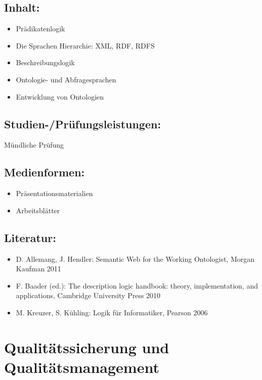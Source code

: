 \section*{Inhalt:}\label{inhalt-20}

\begin{itemize}
\tightlist
\item
  Prädikatenlogik
\item
  Die Sprachen Hierarchie: XML, RDF, RDFS
\item
  Beschreibungslogik
\item
  Ontologie- und Abfragesprachen
\item
  Entwicklung von Ontologien
\end{itemize}

\section*{Studien-/Prüfungsleistungen:}\label{studien-pruxfcfungsleistungen-20}

Mündliche Prüfung

\section*{Medienformen:}\label{medienformen-20}

\begin{itemize}
\tightlist
\item
  Präsentationsmaterialien
\item
  Arbeitsblätter
\end{itemize}

\section*{Literatur:}\label{literatur-17}

\begin{itemize}
\tightlist
\item
  D. Allemang, J. Hendler: Semantic Web for the Working Ontologist,
  Morgan Kaufman 2011
\item
  F. Baader (ed.): The description logic handbook: theory,
  implementation, and applications, Cambridge University Press 2010
\item
  M. Kreuzer, S. Kühling: Logik für Informatiker, Pearson 2006
\end{itemize}

\chapter{Qualitätssicherung und
Qualitätsmanagement}\label{qualituxe4tssicherung-und-qualituxe4tsmanagement}

